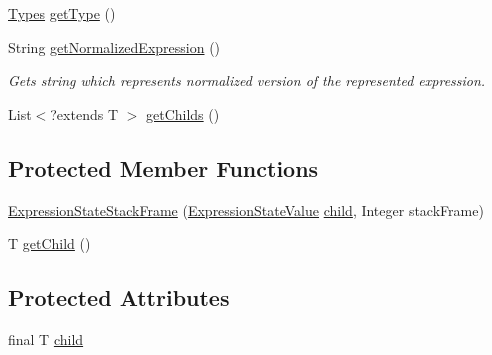 \begin{DoxyCompactItemize}
\item 
\hyperlink{enumgov_1_1nasa_1_1jpf_1_1inspector_1_1server_1_1expression_1_1_types}{Types} \hyperlink{classgov_1_1nasa_1_1jpf_1_1inspector_1_1server_1_1expression_1_1expressions_1_1_expression_state_stack_frame_ae92b0722b0e9d38d73d7e796c5836d94}{get\+Type} ()
\item 
String \hyperlink{classgov_1_1nasa_1_1jpf_1_1inspector_1_1server_1_1expression_1_1expressions_1_1_expression_state_stack_frame_acb8b5f107d7ebab62db22c7b2a9a91b0}{get\+Normalized\+Expression} ()
\begin{DoxyCompactList}\small\item\em Gets string which represents normalized version of the represented expression. \end{DoxyCompactList}\item 
List$<$?extends T $>$ \hyperlink{classgov_1_1nasa_1_1jpf_1_1inspector_1_1server_1_1expression_1_1_expression_state_unary_operator_ad010bcb9c4e2eb584321b5ceba8e1682}{get\+Childs} ()
\end{DoxyCompactItemize}
\subsection*{Protected Member Functions}
\begin{DoxyCompactItemize}
\item 
\hyperlink{classgov_1_1nasa_1_1jpf_1_1inspector_1_1server_1_1expression_1_1expressions_1_1_expression_state_stack_frame_a7ff93e2c4cd8e8f7b522cffe63c0b095}{Expression\+State\+Stack\+Frame} (\hyperlink{classgov_1_1nasa_1_1jpf_1_1inspector_1_1server_1_1expression_1_1expressions_1_1_expression_state_value}{Expression\+State\+Value} \hyperlink{classgov_1_1nasa_1_1jpf_1_1inspector_1_1server_1_1expression_1_1_expression_state_unary_operator_a66041b1f569a361549e28a00f7ca5f2f}{child}, Integer stack\+Frame)
\item 
T \hyperlink{classgov_1_1nasa_1_1jpf_1_1inspector_1_1server_1_1expression_1_1_expression_state_unary_operator_a150bac338d6557f79ca185d3f6ad6e06}{get\+Child} ()
\end{DoxyCompactItemize}
\subsection*{Protected Attributes}
\begin{DoxyCompactItemize}
\item 
final T \hyperlink{classgov_1_1nasa_1_1jpf_1_1inspector_1_1server_1_1expression_1_1_expression_state_unary_operator_a66041b1f569a361549e28a00f7ca5f2f}{child}
\end{DoxyCompactItemize}
